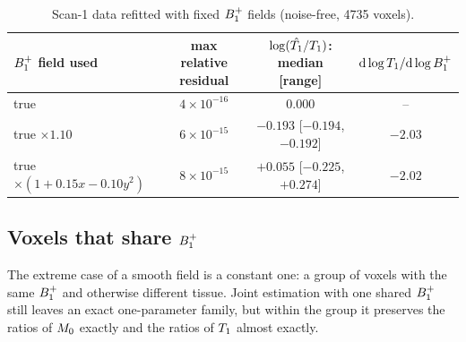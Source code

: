 \begin{table}[!htbp]
\centering
\caption{Scan-1 data refitted with fixed $B_1^{+}$ fields (noise-free, 4735 voxels).}
\label{tab:singlescan}
\small
\begin{tabular}{lccc}
\toprule
$B_1^{+}$ field used & max relative residual & $\log(\hat{T_1}/T_1)$: median [range] & $\mathrm d\log T_1/\mathrm d\log B_1^{+}$\\
\midrule
true & $4\times10^{-16}$ & $0.000$ & --\\
true $\times1.10$ & $6\times10^{-15}$ & $-0.193$ [$-0.194$, $-0.192$] & $-2.03$\\
true $\times(1+0.15x-0.10y^2)$ & $8\times10^{-15}$ & $+0.055$ [$-0.225$, $+0.274$] & $-2.02$\\
\bottomrule
\end{tabular}
\end{table}

\subsection{Voxels that share $B_1^{+}$}\label{sec:shared}

The extreme case of a smooth field is a constant one: a group of voxels with the same $B_1^{+}$ and
otherwise different tissue. Joint estimation with one shared $B_1^{+}$ still leaves an exact
one-parameter family, but within the group it preserves the ratios of $M_0$ exactly and the
ratios of $T_1$ almost exactly.

